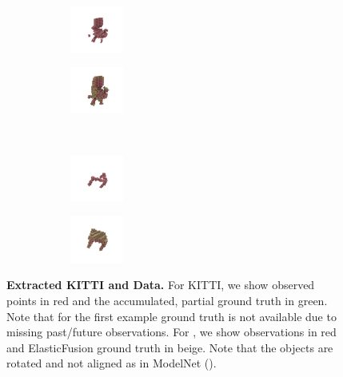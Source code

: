 \begin{figure}[t]
\begin{subfigure}[t]{0.235\textwidth}
        \begin{subfigure}[t]{0.48\textwidth}
            \includegraphics[width=1.75cm,trim={\cropleft cm \croplower cm \cropright cm \cropupper cm},clip]{gdat_yang_chair_1_bin_points}
        \end{subfigure}
        \begin{subfigure}[t]{0.48\textwidth}
            \includegraphics[width=1.75cm,trim={\cropleft cm \croplower cm \cropright cm \cropupper cm},clip]{gdat_yang_chair_1_bin}
        \end{subfigure}
        \\
        \begin{subfigure}[t]{0.48\textwidth}
            \includegraphics[width=1.75cm,trim={\cropleft cm \croplower cm \cropright cm \cropupper cm},clip]{gdat_yang_table_5_bin_points}
        \end{subfigure}
        \begin{subfigure}[t]{0.48\textwidth}
            \includegraphics[width=1.75cm,trim={\cropleft cm \croplower cm \cropright cm \cropupper cm},clip]{gdat_yang_table_5_bin}
        \end{subfigure}
    \end{subfigure}
    \vspace*{-\figskipcaption px}
	\caption{{{\bf Extracted KITTI and \Kinect Data.} For KITTI, we show observed points in {\color{rred}red} and the accumulated, partial ground truth in {\color{rgreen}green}. Note that for the first example ground truth is not available due to missing past/future observations. For \Kinect, we show observations in {\color{rred}red} and ElasticFusion \citep{Whelan2015RSS} ground truth in {\color{rbeige}beige}. Note that the objects are rotated and not aligned as in ModelNet (\cf {}).}}
	\label{fig:data-kitti-yang}
    \vspace*{-\figskipbelow px}
\end{figure}